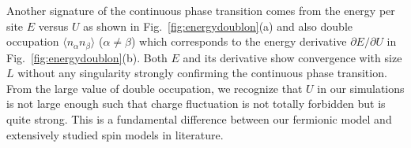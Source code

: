 \documentclass[twocolumn,superscriptaddress]{revtex4-1}
\begin{document}
Another signature of the continuous phase transition comes from the energy per site $E$ versus $U$ as shown in Fig.~\ref{fig:energydoublon}(a) and also double occupation $\langle n_\alpha n_\beta \rangle$ ($\alpha\ne\beta$) which corresponds to the energy derivative $\partial E/\partial U$ in Fig.~\ref{fig:energydoublon}(b). Both $E$ and its derivative show convergence with size $L$ without any singularity strongly confirming the continuous phase transition. From the large value of double occupation, we recognize that $U$ in our simulations is not large enough such that charge fluctuation is not totally forbidden but is quite strong. This is a fundamental difference between our fermionic model and extensively studied spin models in literature.




\end{document}
